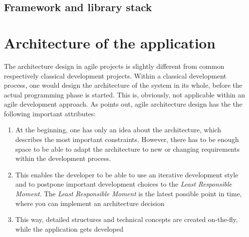 \subsection{Framework and library stack}

\section{Architecture of the application}
The architecture design in agile projects is slightly different from common respectively classical development projects. Within a classical development process, one would design the architecture of the system in its whole, before the actual programming phase is started. This is, obviously, not applicable within an agile development approach. As \cite{Mast2013} points out, agile architecture design has the the following important attributes:

\begin{enumerate}
	\item At the beginning, one has only an idea about the architecture, which describes the most important constraints. However, there has to be enough space to be able to adapt the architecture to new or changing requirements within the development process.
	\item This enables the developer to be able to use an iterative development style and to postpone important development choices to the \textit{Least Responsible Moment}. The \textit{Least Responsible Moment} is the latest possible point in time, where you can implement an architecture decision 
	\item This way, detailed structures and technical concepts are created on-the-fly, while the application gets developed
\end{enumerate}


